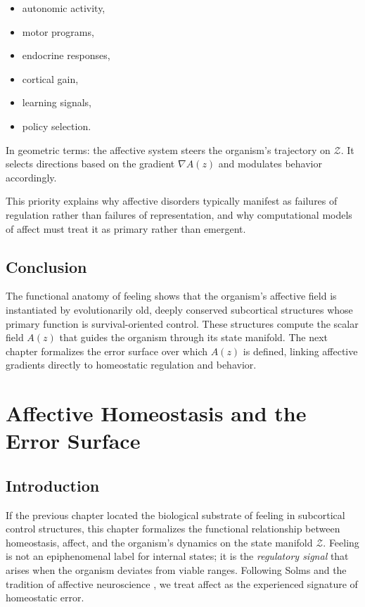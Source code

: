 \documentclass[12pt,oneside]{book}
\theoremstyle{plain}
\theoremstyle{definition}
\let\citep\parencite
\begin{document}
\begin{itemize}
    \item autonomic activity,
    \item motor programs,
    \item endocrine responses,
    \item cortical gain,
    \item learning signals,
    \item policy selection.
\end{itemize}

In geometric terms:
the affective system steers the organism’s trajectory on $\mathcal{Z}$.
It selects directions based on the gradient $\nabla A(z)$ and modulates
behavior accordingly.

This priority explains why affective disorders typically manifest as failures
of regulation rather than failures of representation, and why computational
models of affect must treat it as primary rather than emergent.

\section{Conclusion}

The functional anatomy of feeling shows that the organism’s affective field
is instantiated by evolutionarily old, deeply conserved subcortical
structures whose primary function is survival-oriented control.
These structures compute the scalar field $A(z)$ that guides the organism
through its state manifold.
The next chapter formalizes the error surface over which $A(z)$ is defined,
linking affective gradients directly to homeostatic regulation and behavior.

\chapter{Affective Homeostasis and the Error Surface}

\section{Introduction}

If the previous chapter located the biological substrate of feeling in
subcortical control structures, this chapter formalizes the functional
relationship between homeostasis, affect, and the organism’s dynamics on the
state manifold $\mathcal{Z}$.
Feeling is not an epiphenomenal label for internal states; it is the
\emph{regulatory signal} that arises when the organism deviates from viable
ranges.
Following Solms \citep{solms2021hidden} and the tradition of affective
neuroscience \citep{panksepp1998affective,panksepp2012archeology}, we treat
affect as the experienced signature of homeostatic error.
\end{document}
